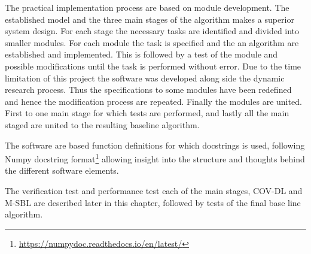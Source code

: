 The practical implementation process are based on module development. The established model and the three main stages of the algorithm makes a superior system design. For each stage the necessary tasks are identified and divided into smaller modules. For each module the task is specified and the an algorithm are established and implemented. This is followed by a test of the module and possible modifications until the task is performed without error. 
Due to the time limitation of this project the software was developed along side the dynamic research process. Thus the specifications to some modules have been redefined and hence the modification process are repeated. 
Finally the modules are united. First to one main stage for which tests are performed, and lastly all the main staged are united to the resulting baseline algorithm.

The software are based function definitions for which docstrings is used, following Numpy docstring format\footnote{\url{https://numpydoc.readthedocs.io/en/latest/}} allowing insight
into the structure and thoughts behind the different software elements.

The verification test and performance test each of the main stages, COV-DL and M-SBL are described later in this chapter, followed by tests of the final base line algorithm. 

